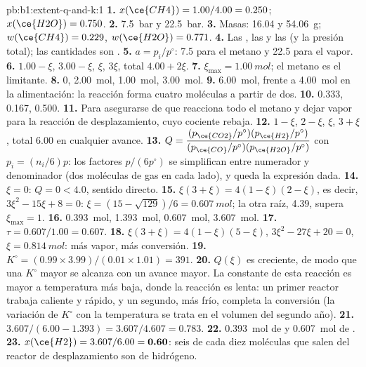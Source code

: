 \begin{solution}{pb:b1:extent-q-and-k:1}
\textbf{1.} $x(\ce{CH4}) = 1.00/4.00 = 0.250$; $x(\ce{H2O}) = 0.750$.
\textbf{2.} \qty{7.5}{bar} y \qty{22.5}{bar}.
\textbf{3.} Masas: 16.04 y \qty{54.06}{g}; $w(\ce{CH4}) = 0.229$,
$w(\ce{H2O}) = 0.771$.
\textbf{4.} Las , las  y las  (y la presión total); las cantidades son .
\textbf{5.} $a = p_i/p^\circ$: 7.5 para el metano y 22.5 para el vapor.
\textbf{6.}  $1.00 - \xi$,  $3.00 - \xi$,  $\xi$,
 $3\xi$, total $4.00 + 2\xi$.
\textbf{7.} $\xi_{\max} = \qty{1.00}{mol}$; el metano es el limitante.
\textbf{8.}  0,  \qty{2.00}{mol},  \qty{1.00}{mol},
 \qty{3.00}{mol}.
\textbf{9.} \qty{6.00}{mol}, frente a \qty{4.00}{mol} en la alimentación:
la reacción forma cuatro moléculas a partir de dos.
\textbf{10.}  0.333,  0.167,  0.500.
\textbf{11.} Para asegurarse de que reacciona todo el metano y dejar vapor
para la reacción de desplazamiento, cuyo cociente rebaja.
\textbf{12.}  $1 - \xi$,  $2 - \xi$,  $\xi$, 
$3 + \xi$, total 6.00 en cualquier avance.
\textbf{13.} $Q = \dfrac{(p_{\ce{CO2}}/p^\circ)(p_{\ce{H2}}/p^\circ)}
{(p_{\ce{CO}}/p^\circ)(p_{\ce{H2O}}/p^\circ)}$ con $p_i = (n_i/6)p$: los
factores $p/(6p^\circ)$ se simplifican entre numerador y denominador (dos
moléculas de gas en cada lado), y queda la expresión dada.
\textbf{14.} $\xi = 0$: $Q = 0 < 4.0$, sentido directo.
\textbf{15.} $\xi(3 + \xi) = 4(1 - \xi)(2 - \xi)$, es decir, $3\xi^2 - 15\xi +
8 = 0$: $\xi = (15 - \sqrt{129})/6 = \qty{0.607}{mol}$; la otra raíz,
4.39, supera $\xi_{\max} = 1$.
\textbf{16.}  \qty{0.393}{mol},  \qty{1.393}{mol},
 \qty{0.607}{mol},  \qty{3.607}{mol}.
\textbf{17.} $\tau = 0.607/1.00 = 0.607$.
\textbf{18.} $\xi(3 + \xi) = 4(1 - \xi)(5 - \xi)$, $3\xi^2 - 27\xi + 20 =
0$, $\xi = \qty{0.814}{mol}$: más vapor, más conversión.
\textbf{19.} $K^\circ = (0.99 \times 3.99)/(0.01 \times 1.01) = 391$.
\textbf{20.} $Q(\xi)$ es creciente, de modo que una $K^\circ$ mayor se
alcanza con un avance mayor. La constante de esta reacción es mayor a
temperatura más baja, donde la reacción es lenta: un primer reactor
trabaja caliente y rápido, y un segundo, más frío, completa la conversión
(la variación de $K^\circ$ con la temperatura se trata en el volumen del
segundo año).
\textbf{21.} $3.607/(6.00 - 1.393) = 3.607/4.607 = 0.783$.
\textbf{22.} \qty{0.393}{mol} de  y \qty{0.607}{mol} de .
\textbf{23.} $x(\ce{H2}) = 3.607/6.00 = \textbf{0.60}$: seis de cada diez
moléculas que salen del reactor de desplazamiento son de hidrógeno.
\end{solution}
